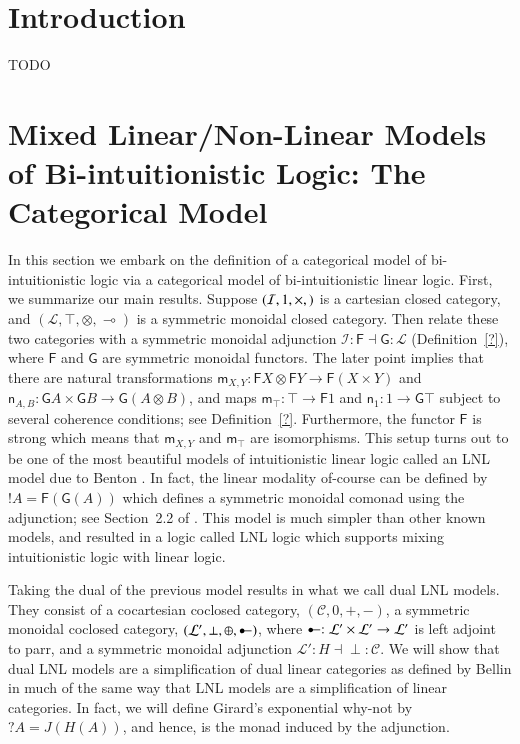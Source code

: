 \documentclass{lmcs}
\let\mto\to
\let\to\relax
\newcommand{\to}{\rightarrow}
\newcommand{\cat}[1]{\mathcal{#1}}
\newcommand{\func}[1]{\mathsf{#1}}
\newcommand{\limp}[0]{\multimap}
\newcommand{\colimp}[0]{\multimapdotinv}
\newcommand{\m}[1]{\mathsf{m}_{#1}}
\newcommand{\n}[1]{\mathsf{n}_{#1}}
\begin{document}
\section{Introduction}
\label{sec:introduction}
TODO \cite{?}

\section{Mixed Linear/Non-Linear Models of Bi-intuitionistic Logic: The Categorical Model}
\label{sec:the_categorical_model}

In this section we embark on the definition of a categorical model of
bi-intuitionistic logic via a categorical model of bi-intuitionistic
linear logic.  First, we summarize our main results.  Suppose
$(\cat{I}, 1, \times, \to)$ is a cartesian closed category, and
$(\cat{L}, \top, \otimes, \limp)$ is a symmetric monoidal closed
category.  Then relate these two categories with a symmetric monoidal
adjunction $\cat{I} : \func{F} \dashv \func{G} : \cat{L}$
(Definition~\ref{?}), where $\func{F}$ and $\func{G}$ are symmetric
monoidal functors.  The later point implies that there are natural
transformations $\m{X,Y} : \func{F}X \otimes \func{F}Y \mto
\func{F}(X \times Y)$ and $\n{A,B} : \func{G}A \times \func{G}B \mto
\func{G}(A \otimes B)$, and maps $\m\top : \top \mto \func{F}1$ and
$\n1 : 1 \mto \func{G}\top$ subject to several coherence conditions;
see Definition~\ref{?}.  Furthermore, the functor $\func{F}$ is strong
which means that $\m{X,Y}$ and $\m{\top}$ are isomorphisms.  This
setup turns out to be one of the most beautiful models of
intuitionistic linear logic called an LNL model due to Benton
\cite{Benton:1994}.  In fact, the linear modality of-course can be
defined by $!A = \func{F}(\func{G}(A))$ which defines a symmetric
monoidal comonad using the adjunction; see Section~2.2 of
\cite{Benton:1994}.  This model is much simpler than other known
models, and resulted in a logic called LNL logic which supports mixing
intuitionistic logic with linear logic.

Taking the dual of the previous model results in what we call dual LNL
models. They consist of a cocartesian coclosed category, $(\cat{C},
0, +, -)$, a symmetric monoidal coclosed category, $(\cat{L}', \perp,
\oplus, \colimp)$, where $\colimp : \cat{L}' \times \cat{L}' \mto
\cat{L}'$ is left adjoint to parr, and a symmetric monoidal adjunction
$\cat{L'} : H \dashv \perp : \cat{C}$.  We will show that dual LNL models
are a simplification of dual linear categories as defined by Bellin
\cite{Bellin:2012} in much of the same way that LNL models are a
simplification of linear categories.  In fact, we will define Girard's
exponential why-not by $? A = J(H(A))$, and hence, is the monad
induced by the adjunction.
\end{document}
